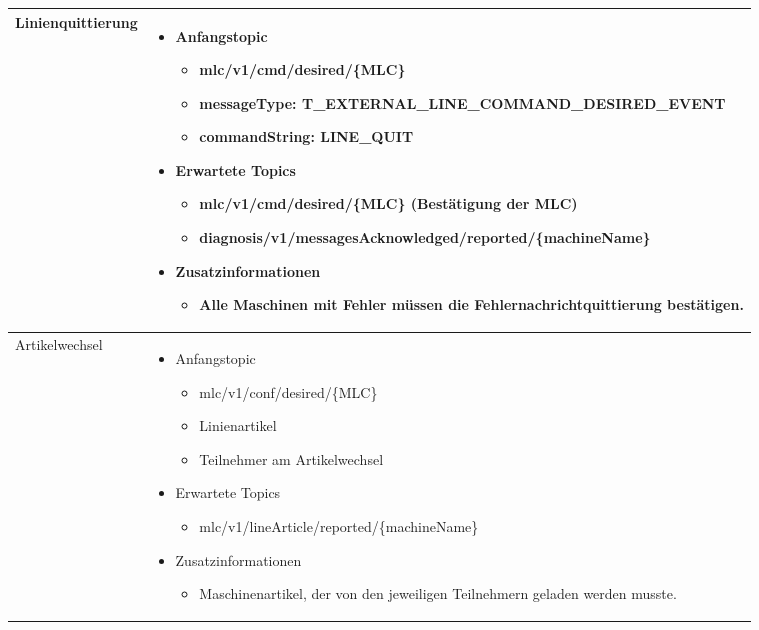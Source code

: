 \begin{longtable}{p{2.5cm} p{12cm}}
    \midrule Linienquittierung & \begin{itemize} \item Anfangstopic \begin{itemize} \item mlc/v1/cmd/desired/\{MLC\} \item messageType: T\_EXTERNAL\_LINE\_COMMAND\_\-DESIRED\_EVENT \item commandString: LINE\_QUIT \end{itemize} \item Erwartete Topics \begin{itemize} \item mlc/v1/cmd/desired/\{MLC\} (Bestätigung der MLC) \item diagnosis/v1/messagesAcknowledged/reported/\{ma\-chineName\} \end{itemize} \item Zusatzinformationen \begin{itemize} \item Alle Maschinen mit Fehler müssen die Fehlernachrichtquittierung bestätigen. \end{itemize} \end{itemize} \\ 
    \midrule Artikelwechsel & \begin{itemize} \item Anfangstopic \begin{itemize} \item mlc/v1/conf/desired/\{MLC\} \item Linienartikel \item Teilnehmer am Artikelwechsel \end{itemize} \item Erwartete Topics \begin{itemize} \item mlc/v1/lineArticle/reported/\{machineName\} \end{itemize} \item Zusatzinformationen \begin{itemize} \item Maschinenartikel, der von den jeweiligen Teilnehmern geladen werden musste. \end{itemize} \end{itemize} \\ 

\end{longtable}
